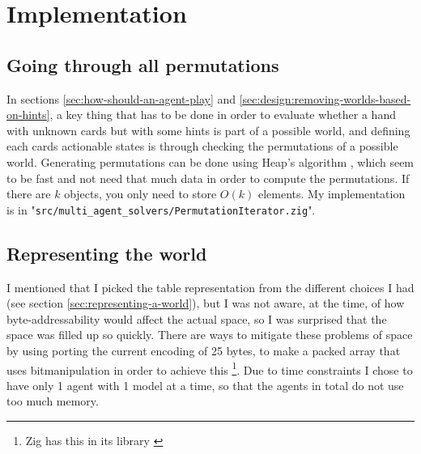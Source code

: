 \section{Implementation}


\subsection{Going through all permutations}
In sections \ref{sec:how-should-an-agent-play} and \ref{sec:design:removing-worlds-based-on-hints}, a key thing that has to be done in order to evaluate whether a hand with unknown cards but with some hints is part of a possible world, and defining each cards actionable states is through checking the permutations of a possible world.
Generating permutations can be done using Heap's algorithm \cite{wiki:heapsalgorithm}, which seem to be fast and not need that much data in order to compute the permutations. If there are $k$ objects, you only need to store $O(k)$ elements. My implementation is in "{\tt src/multi\_agent\_solvers/PermutationIterator.zig}". 

\subsection{Representing the world}
I mentioned that I picked the table representation from the different choices I had (see section \ref{sec:representing-a-world}), but I was not aware, at the time, of how byte-addressability would affect the actual space, so I was surprised that the space was filled up so quickly. There are ways to mitigate these problems of space by using porting the current encoding of 25 bytes, to make a packed array that uses bitmanipulation in order to achieve this \footnote{Zig has this in its library \cite{packed_int_array}}. Due to time constraints I chose to have only 1 agent with 1 model at a time, so that the agents in total do not use too much memory.

